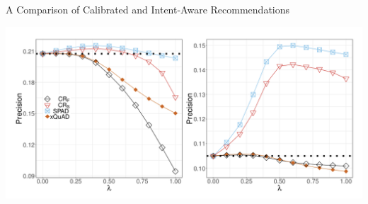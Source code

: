 \documentclass[11pt,aspectratio=169,handout]{beamer}
\begin{document}
\begin{frame}{A Comparison of Calibrated and Intent-Aware Recommendations \cite{BRIDGE}}
\begin{center}
\includegraphics[scale=0.5]{images/spad.png}
\end{center}
\end{frame}
\end{document}
